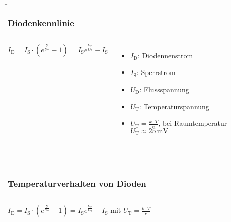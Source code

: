 \begin{frame}
\b{\frametitle{Diodenkennlinie}
    \begin{columns}
            \resizebox{1\totalheight}{!}{}
            $I_\mathrm{D} = I_\mathrm{S} \cdot (e^{\frac{U}{U_\mathrm{T}}} - 1) = I_\mathrm{S}  e^{\frac{U_\mathrm{D}}{U_\mathrm{T}}} - I_\mathrm{S}$
                \begin{itemize}
                    \item $I_\mathrm{D}$: Diodennenstrom
                    \item $I_\mathrm{S}$: Sperrstrom
                    \item $U_\mathrm{D}$: Flussspannung
                    \item $U_\mathrm{T}$: Temperaturspannung
                    \item $U_\mathrm{T} = \frac{k \cdot T}{e}$, bei Raumtemperatur $U_\mathrm{T} \approx 25\,\mathrm{mV}$
                \end{itemize}
            \end{columns}}
\end{frame}

\begin{frame}
\b{\frametitle{Temperaturverhalten von Dioden}
    \begin{columns}
            \resizebox{1\totalheight}{!}{}
            $I_\mathrm{D} = I_\mathrm{S} \cdot (e^{\frac{U}{U_\mathrm{T}}} - 1) = I_\mathrm{S}  e^{\frac{U_\mathrm{D}}{U_\mathrm{T}}} - I_\mathrm{S}$ mit $U_\mathrm{T} = \frac{k \cdot T}{e}$
                \begin{itemize}
                \end{itemize}
            \end{columns}}
        \end{frame}


